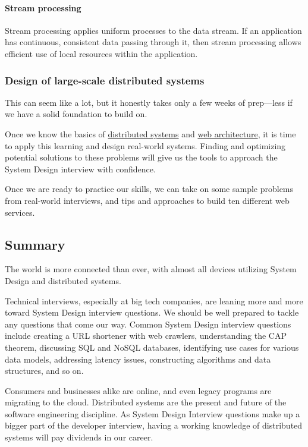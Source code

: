 \paragraph{Stream processing}\label{wrfDbCM4l11idT-zgzPoK}

Stream processing applies uniform processes to the data stream. If an application has continuous, consistent data passing through it, then stream processing allows efficient use of local resources within the application.

\subsubsection{Design of large-scale distributed systems}\label{e4_-kYk8BH6abWM0eQ6CR}

This can seem like a lot, but it honestly takes only a few weeks of prep---less if we have a solid foundation to build on.

Once we know the basics of \href{https://www.educative.io/courses/distributed-systems-practitioners}{distributed systems} and \href{https://www.educative.io/courses/software-architecture-in-applications}{web architecture}, it is time to apply this learning and design real-world systems. Finding and optimizing potential solutions to these problems will give us the tools to approach the System Design interview with confidence.

Once we are ready to practice our skills, we can take on some sample problems from real-world interviews, and tips and approaches to build ten different web services.

\subsection{Summary}\label{vYe5Uua6uuB405yTeeTW_}

The world is more connected than ever, with almost all devices utilizing System Design and distributed systems.

Technical interviews, especially at big tech companies, are leaning more and more toward System Design interview questions. We should be well prepared to tackle any questions that come our way. Common System Design interview questions include creating a URL shortener with web crawlers, understanding the CAP theorem, discussing SQL and NoSQL databases, identifying use cases for various data models, addressing latency issues, constructing algorithms and data structures, and so on.

Consumers and businesses alike are online, and even legacy programs are migrating to the cloud. Distributed systems are the present and future of the software engineering discipline. As System Design Interview questions make up a bigger part of the developer interview, having a working knowledge of distributed systems will pay dividends in our career.


